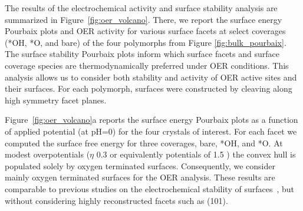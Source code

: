 %
%
The results of the electrochemical activity and surface stability analysis are summarized in Figure~\ref{fig:oer_volcano}.
%
There, we report the surface energy Pourbaix plots and OER activity for various surface facets at select coverages (*OH, *O, and bare) of the four \IrOx polymorphs from Figure \ref{fig:bulk_pourbaix}.
%
The surface stability Pourbaix plots inform which surface facets and surface coverage species are thermodynamically preferred under OER conditions.
%
This analysis allows us to consider both stability and activity of OER active sites and their surfaces.
%
For each polymorph, surfaces were constructed by cleaving along high symmetry facet planes.


%
%
Figure~\ref{fig:oer_volcano}a reports the surface energy Pourbaix plots as a function of applied potential (at pH\num{=0}) for the four \IrOx crystals of interest.
%
For each facet we computed the surface free energy for three coverages, bare, *OH, and *O.
%
At modest overpotentials ($\eta$ \mytilde\num{0.3} or equivalently potentials of \mytilde\num{1.5} \VRHE) the convex hull is populated solely by oxygen terminated surfaces.
%
Consequently, we consider mainly oxygen terminated surfaces for the OER analysis.
%
These results are comparable to previous studies on the electrochemical stability of \IrOtwo surfaces~\cite{Nattino2019},
but without considering highly reconstructed facets such as (101).


